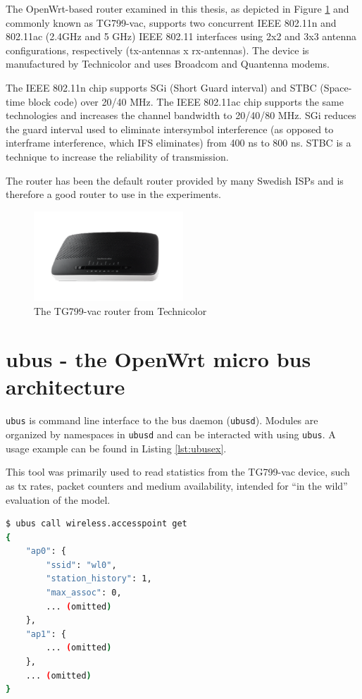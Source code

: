 The OpenWrt-based router examined in this thesis, as depicted in Figure
\ref{fig:tg799} and commonly known as TG799-vac, supports two concurrent IEEE
802.11n and 802.11ac (2.4GHz and 5 GHz) IEEE 802.11 interfaces using 2x2 and
3x3 antenna configurations, respectively (tx-antennas x rx-antennas).  The
device is manufactured by Technicolor and uses Broadcom and Quantenna modems.

The IEEE 802.11n chip supports SGi (Short Guard interval) and STBC (Space-time
block code) over 20/40 MHz. The IEEE 802.11ac chip supports the same
technologies and increases the channel bandwidth to 20/40/80 MHz. SGi reduces
the guard interval used to eliminate intersymbol interference (as opposed to
interframe interference, which IFS eliminates) from 400 ns to 800 ns. STBC is
a technique to increase the reliability of transmission.

The router has been the default router provided by many Swedish ISPs and is
therefore a good router to use in the experiments. 

\begin{figure}
\center
\includegraphics[width=0.5\textwidth]{images/tg799.png}
\caption{The TG799-vac router from Technicolor}
\label{fig:tg799}
\end{figure}

\section{ubus - the OpenWrt micro bus architecture}

\texttt{ubus} is command line interface to the bus daemon (\texttt{ubusd}).
Modules are organized by namespaces in \texttt{ubusd} and can be interacted 
with using \texttt{ubus}. A usage example can be found in Listing \ref{lst:ubusex}.

This tool was primarily used to read statistics from the TG799-vac device,
such as tx rates, packet counters and medium availability, intended for ``in
the wild'' evaluation of the model.

\begin{lstlisting}[language=bash,caption={ubus call listing all access points on this device},label=lst:ubusex]
$ ubus call wireless.accesspoint get
{
    "ap0": {
        "ssid": "wl0",
        "station_history": 1,
        "max_assoc": 0,
        ... (omitted)
    },
    "ap1": {
        ... (omitted)
    },
    ... (omitted)
}
\end{lstlisting}

